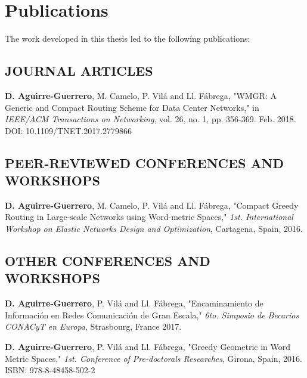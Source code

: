 \chapter*{Publications}%
\label{sec:publications}

The work developed in this thesis led to the following publications:

\section*{JOURNAL ARTICLES}
\begin{enumerate}[{[1]}]
  \item \textbf{D. Aguirre-Guerrero}, M. Camelo, P. Vil\'a and Ll. F\'abrega, 
  "WMGR: A Generic and Compact Routing Scheme for Data Center Networks," in
  \textit{IEEE/ACM Transactions on Networking}, vol. 26, no. 1, pp. 356-369. Feb. 2018.
  DOI: 10.1109/TNET.2017.2779866
\end{enumerate}

\section*{PEER-REVIEWED CONFERENCES AND WORKSHOPS}
\begin{enumerate}[{[1]}]
  \item \textbf{D. Aguirre-Guerrero}, M. Camelo, P. Vil\'a and Ll. F\'abrega, 
  "Compact Greedy Routing in Large-scale Networks using Word-metric Spaces,"
  \textit{1st. International Workshop on Elastic Networks Design and Optimization},
  Cartagena, Spain, 2016.
\end{enumerate}


\section*{OTHER CONFERENCES AND WORKSHOPS}

\begin{enumerate}[{[1]}]
  \item \textbf{D. Aguirre-Guerrero}, P. Vil\'a and Ll. F\'abrega, 
  "Encaminamiento de Informaci{\'o}n en Redes Comunicaci{\'o}n de Gran Escala,"
  \textit{6to. Simposio de Becarios CONACyT en Europa}, Strasbourg, France 2017.
  \item \textbf{D. Aguirre-Guerrero}, P. Vil\'a and Ll. F\'abrega, 
  "Greedy Geometric in Word Metric Spaces,"
  \textit{1st. Conference of Pre-doctorals Researches}, Girona, Spain, 2016. 
  ISBN: 978-8-48458-502-2
\end{enumerate}
